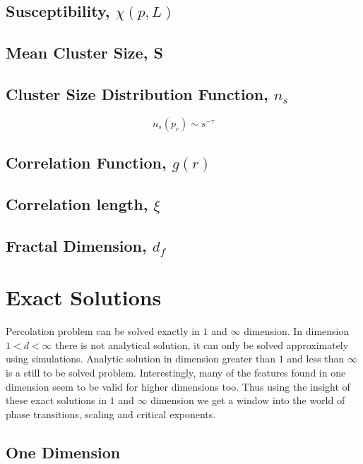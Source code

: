 	
	\subsection{Susceptibility, $\chi(p,L)$}
	\subsection{Mean Cluster Size, S}
	\subsection{Cluster Size Distribution Function, $n_s$} \label{subsect:cluster-size-dist-func}
		\begin{equation}
			n_s(p_c)\sim s^{-\tau}
		\end{equation}
	\subsection{Correlation Function, $g(r)$}		
	\subsection{Correlation length, $\xi$}
	\subsection{Fractal Dimension, $d_f$} \label{subsect:fractal-dim}

\section{Exact Solutions}
	Percolation problem can be solved exactly in $1$ and $\infty$ dimension. In dimension $1 < d < \infty$ there is not analytical solution, it can only be solved approximately using simulations. Analytic solution in dimension greater than $1$ and less than $\infty$ is a still to be solved problem. Interestingly, many of the features found in one dimension seem to be valid for higher dimensions too. Thus using the insight of these exact solutions in $1$ and $\infty$ dimension we get a window into the world of phase transitions, scaling and critical exponents.
	\subsection{One Dimension}
